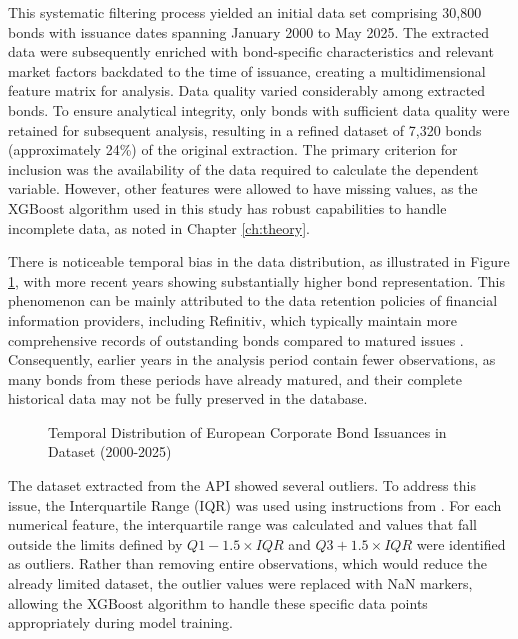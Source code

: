 This systematic filtering process yielded an initial data set comprising 30,800 bonds with issuance dates spanning January 2000 to May 2025. The extracted data were subsequently enriched with bond-specific characteristics and relevant market factors backdated to the time of issuance, creating a multidimensional feature matrix for analysis. Data quality varied considerably among extracted bonds. To ensure analytical integrity, only bonds with sufficient data quality were retained for subsequent analysis, resulting in a refined dataset of 7,320 bonds (approximately 24\%) of the original extraction. The primary criterion for inclusion was the availability of the data required to calculate the dependent variable. However, other features were allowed to have missing values, as the XGBoost algorithm used in this study has robust capabilities to handle incomplete data, as noted in Chapter \ref{ch:theory}.

There is noticeable temporal bias in the data distribution, as illustrated in Figure \ref{fig:data_availability}, with more recent years showing substantially higher bond representation. This phenomenon can be mainly attributed to the data retention policies of financial information providers, including Refinitiv, which typically maintain more comprehensive records of outstanding bonds compared to matured issues \parencite{Faberov2021RetrieveBond}. Consequently, earlier years in the analysis period contain fewer observations, as many bonds from these periods have already matured, and their complete historical data may not be fully preserved in the database.

\begin{figure}[h]
    \begin{center}
        
    \end{center}
    \caption{Temporal Distribution of European Corporate Bond Issuances in Dataset (2000-2025)}
    \label{fig:data_availability}
\end{figure}

The dataset extracted from the API showed several outliers. To address this issue, the Interquartile Range (IQR) was used using instructions from \textcite{Patil2023OutlierMethod}. For each numerical feature, the interquartile range was calculated and values that fall outside the limits defined by $Q1 - 1.5 \times IQR$ and $Q3 + 1.5 \times IQR$ were identified as outliers. Rather than removing entire observations, which would reduce the already limited dataset, the outlier values were replaced with NaN markers, allowing the XGBoost algorithm to handle these specific data points appropriately during model training.

